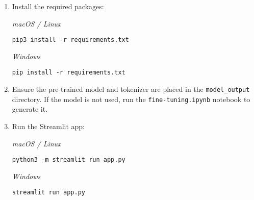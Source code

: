 \begin{enumerate}
    \begin{tcolorbox}[colback=gray!10, colframe=gray!50, breakable, boxrule=0.4pt, sharp corners]
\begin{verbatim}
python -m venv venv
.\venv\Scripts\Activate.ps1
\end{verbatim}
    \end{tcolorbox}
    
    \item Install the required packages:
    
    \textit{macOS / Linux}
    
    \begin{tcolorbox}[colback=gray!10, colframe=gray!50, breakable, boxrule=0.4pt, sharp corners]
\begin{verbatim}
pip3 install -r requirements.txt
\end{verbatim}
    \end{tcolorbox}
    
    \textit{Windows}
    
    \begin{tcolorbox}[colback=gray!10, colframe=gray!50, breakable, boxrule=0.4pt, sharp corners]
\begin{verbatim}
pip install -r requirements.txt
\end{verbatim}
    \end{tcolorbox}
    
    \item Ensure the pre-trained model and tokenizer are placed in the \texttt{model\_output} directory. If the model is not used, run the \texttt{fine-tuning.ipynb} notebook to generate it.
    
    \item Run the Streamlit app:
    
    \textit{macOS / Linux}
    
    \begin{tcolorbox}[colback=gray!10, colframe=gray!50, breakable, boxrule=0.4pt, sharp corners]
\begin{verbatim}
python3 -m streamlit run app.py
\end{verbatim}
    \end{tcolorbox}
    
    \textit{Windows}
    
    \begin{tcolorbox}[colback=gray!10, colframe=gray!50, breakable, boxrule=0.4pt, sharp corners]
\begin{verbatim}
streamlit run app.py
\end{verbatim}
    \end{tcolorbox}
\end{enumerate}
